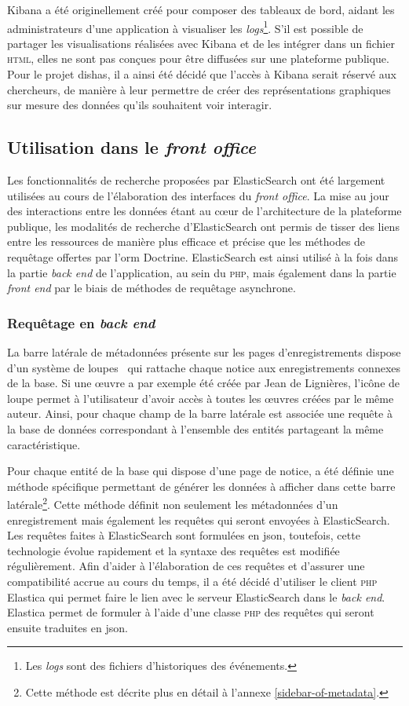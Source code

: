 \documentclass[a4paper,12pt,twoside]{book}
\newcommand{\eng}{\emph}
\newcommand{\bdd}{base de données\xspace}
\newcommand{\html}{\textsc{html}\xspace}
\newcommand{\php}{\textsc{php}\xspace}
\newcommand{\fo}{\eng{front office}\xspace}
\newcommand{\g}[1]{\og#1~\fg}
\newcommand{\dishas}{\gls{dishas}\xspace}
\newcommand{\json}{\gls{json}\xspace}
\newcommand{\orm}{\gls{orm}\xspace}
\begin{document}
Kibana a été originellement créé pour composer des tableaux de bord, aidant les administrateurs d'une application à visualiser les \eng{logs}\footnote{Les \eng{logs} sont des fichiers d'historiques des événements.}. S'il est possible de partager les visualisations réalisées avec Kibana et de les intégrer dans un fichier \html, elles ne sont pas conçues pour être diffusées sur une plateforme publique. Pour le projet \dishas, il a ainsi été décidé que l'accès à Kibana serait réservé aux chercheurs, de manière à leur permettre de créer des représentations graphiques sur mesure des données qu'ils souhaitent voir interagir.

		\subsection{Utilisation dans le \fo}
Les fonctionnalités de recherche proposées par ElasticSearch ont été largement utilisées au cours de l'élaboration des interfaces du \fo. La mise au jour des interactions entre les données étant au cœur de l'architecture de la plateforme publique, les modalités de recherche d'ElasticSearch ont permis de tisser des liens entre les ressources de manière plus efficace et précise que les méthodes de requêtage offertes par l'\orm Doctrine. ElasticSearch est ainsi utilisé à la fois dans la partie \eng{back end} de l'application, au sein du \php, mais également dans la partie \eng{front end} par le biais de méthodes de requêtage asynchrone.

			\subsubsection{Requêtage en \eng{back end}}
La barre latérale de métadonnées présente sur les pages d'enregistrements dispose d'un système de \g{loupes} qui rattache chaque notice aux enregistrements connexes de la base. Si une œuvre a par exemple été créée par Jean de Lignières, l'icône de loupe permet à l'utilisateur d'avoir accès à toutes les œuvres créées par le même auteur. Ainsi, pour chaque champ de la barre latérale est associée une requête à la \bdd correspondant à l'ensemble des entités partageant la même caractéristique.

Pour chaque entité de la base qui dispose d'une page de notice, a été définie une méthode spécifique permettant de générer les données à afficher dans cette barre latérale\footnote{Cette méthode est décrite plus en détail à l'annexe \ref{sidebar-of-metadata}.}. Cette méthode définit non seulement les métadonnées d'un enregistrement mais également les requêtes qui seront envoyées à ElasticSearch. Les requêtes faites à ElasticSearch sont formulées en \json, toutefois, cette technologie évolue rapidement et la syntaxe des requêtes est modifiée régulièrement. Afin d'aider à l'élaboration de ces requêtes et d'assurer une compatibilité accrue au cours du temps, il a été décidé d'utiliser le client \php Elastica qui permet faire le lien avec le serveur ElasticSearch dans le \eng{back end}. Elastica permet de formuler à l'aide d'une classe \php des requêtes qui seront ensuite traduites en \json.
\end{document}
